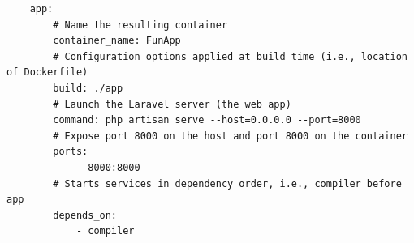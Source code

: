 \documentclass{l4proj}
\begin{document}
\begin{appendices}
\begin{lstlisting}
    app:
        # Name the resulting container
        container_name: FunApp
        # Configuration options applied at build time (i.e., location of Dockerfile)
        build: ./app
        # Launch the Laravel server (the web app)
        command: php artisan serve --host=0.0.0.0 --port=8000
        # Expose port 8000 on the host and port 8000 on the container
        ports:
            - 8000:8000
        # Starts services in dependency order, i.e., compiler before app
        depends_on:
            - compiler
\end{lstlisting}

\end{appendices}




\end{document}
